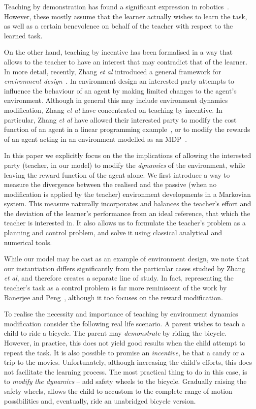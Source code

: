 \documentclass[letterpaper]{aamas2010}
\begin{document}
Teaching by demonstration has found a significant expression in
robotics~\cite{argal_etal_2009}. However, these mostly assume that the
learner actually wishes to learn the task, as well as a certain
benevolence on behalf of the teacher with respect to the learned
task.

On the other hand, teaching by incentive has been formalised in a way
that allows to the teacher to have an interest that may contradict
that of the learner. In more detail, recently, Zhang \emph{et al}
introduced a general framework for \emph{environment
  design}~\cite{Zhang09:General}. In environment design an interested
party attempts to influence the behaviour of an agent by making limited
changes to the agent's environment. Although in general this may
include environment dynamics modification, Zhang \emph{et al} have
concentrated on teaching by incentive. In particular, Zhang \emph{et
  al} have allowed their interested party to modify the cost function
of an agent in a linear programming example~\cite{Zhang09:General}, or
to modify the rewards of an agent acting in an environment modelled as
an MDP~\cite{zhang_parkes_2008,Zhang09:Policy}.

In this paper we explicitly focus on the the implications of allowing
the interested party (teacher, in our model) to modify the
\emph{dynamics} of the environment, while leaving the reward function
of the agent alone. We first introduce a way to measure the divergence
between the realised and the passive (when no modification is applied
by the teacher) environment developments in a Markovian system. This
measure naturally incorporates and balances the teacher's effort and
the deviation of the learner's performance from an ideal reference,
that which the teacher is interested in. It also allows us to
formulate the teacher's problem as a planning and control problem, and
solve it using classical analytical and numerical tools.


While our model may be cast as an example of environment design, we
note that our instantiation differs significantly from the particular
cases studied by Zhang \emph{et al}, and therefore creates a separate
line of study. In fact, representing the teacher's task as a control
problem is far more reminiscent of the work by Banerjee and
Peng~\cite{banerjee_peng_2005}, although it too focuses on the reward
modification.

To realise the necessity and importance of teaching by
environment dynamics modification consider the following real life
scenario. A parent wishes to teach a child to ride a bicycle. The
parent may {\em demonstrate} by riding the bicycle. However, in
practice, this does not yield good results when the child attempt to
repeat the task. It is also possible to promise an {\em incentive}, be
that a candy or a trip to the movies. Unfortunately, although
increasing the child's efforts, this does not facilitate the learning
process. The most practical thing to do in this case, is to {\em
  modify the dynamics} -- add safety wheels to the bicycle. Gradually
raising the safety wheels, allows the child to accustom to the
complete range of motion possibilities and, eventually, ride an
unabridged bicycle version.
\end{document}
